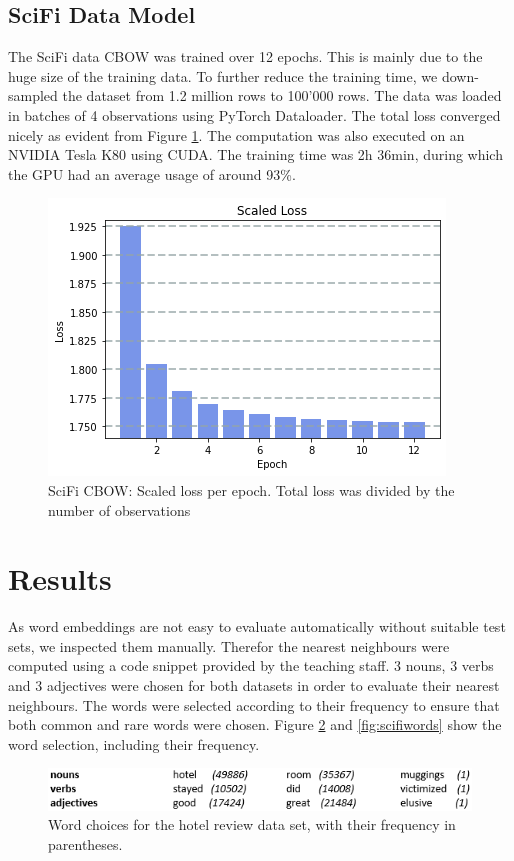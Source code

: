 \documentclass[fleqn,10pt]{SelfArx} %
\begin{document}
\subsection{SciFi Data Model}
The SciFi data CBOW was trained over 12 epochs. This is mainly due to the huge size of the training data. To further reduce the training time, we down-sampled the dataset from 1.2 million rows to 100'000 rows. The data was loaded in batches of 4 observations using PyTorch Dataloader. The total loss converged nicely as evident from Figure \ref{fig:sf-loss}. The computation was also executed on an NVIDIA Tesla K80 using CUDA. The training time was 2h 36min, during which the GPU had an average usage of around 93\%.
\begin{figure}[ht]\centering
	\includegraphics[width=\linewidth]{Figures/Model2 Loss.png}
	\caption{SciFi CBOW: Scaled loss per epoch. Total loss was divided by the number of observations}
	\label{fig:sf-loss}
\end{figure}
\section{Results}
As word embeddings are not easy to evaluate automatically without suitable test sets, we inspected them manually. Therefor the nearest neighbours were computed using a code snippet provided by the teaching staff. 3 nouns, 3 verbs and 3 adjectives were chosen for both datasets in order to evaluate their nearest neighbours. The words were selected according to their frequency to ensure that both common and rare words were chosen.  Figure \ref{fig:hotelwords} and \ref{fig:scifiwords} show the word selection, including their frequency.
\begin{figure}[ht]\centering
	\includegraphics[width=\linewidth]{Figures/hotel_words.png}
	\caption{Word choices for the hotel review data set, with their frequency in parentheses.}
	\label{fig:hotelwords}
\end{figure}
\end{document}
